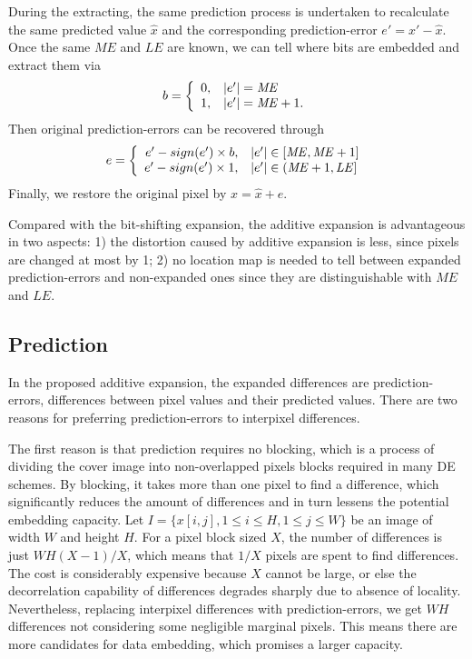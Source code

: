 \documentclass{sig-alternate}
\begin{document}
During the extracting, the same prediction process is undertaken to recalculate the same predicted value $\hat{x}$ and the corresponding prediction-error $e' = x' - \hat{x}$. Once the same $\mathit{ME}$ and $\mathit{LE}$ are known, we can tell where bits are embedded and extract them via
\begin{equation}\label{eqn:addextract}
  b = \left\{ \begin{array}{r@{,\quad}l}
  0 & |e'| = \mathit{ME} \\
  1 & |e'| = \mathit{ME} + 1. \\
\end{array} \right.
\end{equation}
Then original prediction-errors can be recovered through
\begin{equation}\label{eqn:addrecover}
 e = \left\{ \begin{array}{r@{,\quad}l}
  e' - sign(e') \times b & |e'| \in [\mathit{ME}, \mathit{ME}+1] \\
  e' - sign(e') \times 1 & |e'| \in (\mathit{ME}+1, \mathit{LE}] \\
\end{array} \right.
\end{equation}
Finally, we restore the original pixel by $x = \hat{x} + e$.

Compared with the bit-shifting expansion, the additive expansion is advantageous in two aspects: 1)
the distortion caused by additive expansion is less, since pixels are changed at most by 1; 2) no
location map is needed to tell between expanded prediction-errors and non-expanded ones since they
are distinguishable with $\mathit{ME}$ and $\mathit{LE}$.

\subsection{Prediction}\label{sub:pe}
In the proposed additive expansion, the expanded differences are prediction-errors, differences
between pixel values and their predicted values. There are two reasons for preferring
prediction-errors to interpixel differences.

The first reason is that prediction requires no blocking, which is a process of dividing the cover
image into non-overlapped pixels blocks required in many DE schemes. By blocking, it takes more than
one pixel to find a difference, which significantly reduces the amount of differences and in turn
lessens the potential embedding capacity. Let $I=\{x[i,j],1 \le i \le H,1 \le j \le W\}$ be an image
of width $W$ and height $H$. For a pixel block sized $X$, the number of differences is just
$WH(X-1)/X$, which means that $1/X$ pixels are spent to find differences. The cost is considerably
expensive because $X$ cannot be large, or else the decorrelation capability of differences degrades
sharply due to absence of locality. Nevertheless, replacing interpixel differences with
prediction-errors, we get $WH$ differences not considering some negligible marginal pixels. This
means there are more candidates for data embedding, which promises a larger capacity.
\end{document}
